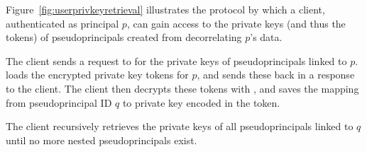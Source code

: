 Figure~\ref{fig:userprivkeyretrieval} illustrates the protocol by which a client, authenticated as
principal $p$, can gain access to the private keys (and thus the tokens) of pseudoprincipals created
from decorrelating $p$'s data.

The client sends a request to \sys for the private keys of pseudoprincipals linked to $p$. \sys
loads the encrypted private key tokens for $p$, and sends these back in a response to the client.
%
The client then decrypts these tokens with , and saves the mapping from pseudoprincipal ID
$q$ to private key  encoded in the token.

The client recursively retrieves the private keys of all pseudoprincipals linked to $q$ until
no more nested pseudoprincipals exist.

\begin{figure*}[t!]
\caption{\textbf{PseudoPrincipal Key Retrieval.}}
\label{fig:userprivkeyretrieval}
\end{figure*}

